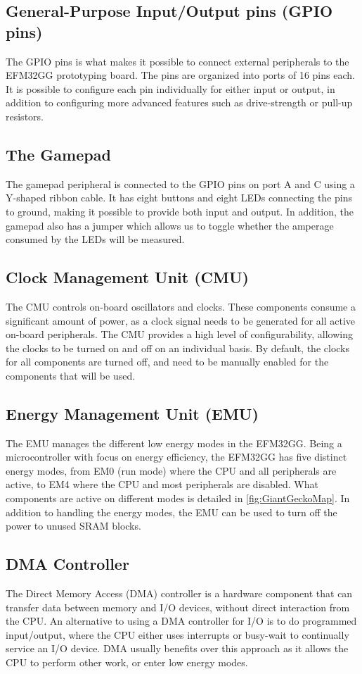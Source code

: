 \subsection{General-Purpose Input/Output pins (GPIO pins)}
The GPIO pins is what makes it possible to connect external peripherals to the EFM32GG prototyping board. The pins are organized into ports of 16 pins each. It is possible to configure each pin individually for either input or output, in addition to configuring more advanced features such as drive-strength or pull-up resistors.

\subsection{The Gamepad}
The gamepad peripheral is connected to the GPIO pins on port A and C using a Y-shaped ribbon cable. It has eight buttons and eight LEDs connecting the pins to ground, making it possible to provide both input and output. In addition, the gamepad also has a jumper which allows us to toggle whether the amperage consumed by the LEDs will be measured.

\subsection{Clock Management Unit (CMU)}
The CMU controls on-board oscillators and clocks. These components consume a significant amount of power, as a clock signal needs to be generated for all active on-board peripherals. The CMU provides a high level of configurability, allowing the clocks to be turned on and off on an individual basis. By default, the clocks for all components are turned off, and need to be manually enabled for the components that will be used.\cite{EFM32GG-RM}

\subsection{Energy Management Unit (EMU)}
The EMU manages the different low energy modes in the EFM32GG. Being a microcontroller with focus on energy efficiency, the EFM32GG has five distinct energy modes, from EM0 (run mode) where the CPU and all peripherals are active, to EM4 where the CPU and most peripherals are disabled. What components are active on different modes is detailed in \ref{fig:GiantGeckoMap}. In addition to handling the energy modes, the EMU can be used to turn off the power to unused SRAM blocks.\cite{EFM32GG-RM}

\subsection{DMA Controller}
The Direct Memory Access (DMA) controller is a hardware component that can transfer data between memory and I/O devices, without direct interaction from the CPU. An alternative to using a DMA controller for I/O is to do programmed input/output, where the CPU either uses interrupts or busy-wait to continually service an I/O device. DMA usually benefits over this approach as it allows the CPU to perform other work, or enter low energy modes.

